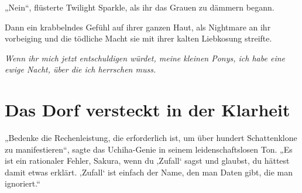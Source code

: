 „Nein“, flüsterte Twilight Sparkle, als ihr das Grauen zu dämmern begann.

Dann ein krabbelndes Gefühl auf ihrer ganzen Haut, als Nightmare an ihr vorbeiging und die tödliche Macht sie mit ihrer kalten Liebkosung streifte.

\emph{Wenn ihr mich jetzt entschuldigen würdet, meine kleinen Ponys, ich habe eine ewige Nacht, über die ich herrschen muss.}

\section{Das Dorf versteckt in der Klarheit\protect\footnotemark}

„Bedenke die Rechenleistung, die erforderlich ist, um über hundert Schattenklone zu manifestieren“, sagte das Uchiha-Genie in seinem leidenschaftslosen Ton. „Es ist ein rationaler Fehler, Sakura, wenn du ‚Zufall‘ sagst und glaubst, du hättest damit etwas erklärt. ‚Zufall‘ ist einfach der Name, den man Daten gibt, die man ignoriert.“

